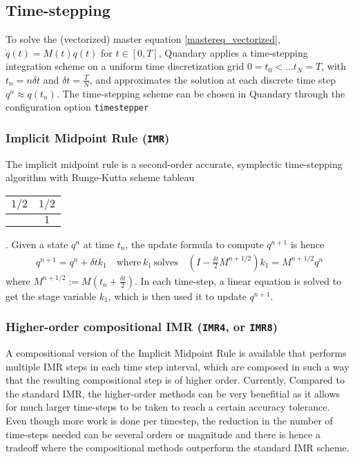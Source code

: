 \documentclass[11pt]{article}
\begin{document}
    \subsection{Time-stepping}
    To solve the (vectorized) master equation \eqref{mastereq_vectorized}, $\dot
    q(t) = M(t) q(t)$ for $t\in [0,T]$, Quandary applies a time-stepping integration
    scheme on a uniform time discretization grid $0=t_0 < \dots t_{N} = T$, with
    $t_n = n \delta t$ and $\delta t = \frac{T}{N}$, and approximates the
    solution at each discrete time step $q^{n} \approx q(t_n)$. The time-stepping scheme can be chosen in Quandary through the configuration option \texttt{timestepper}
    
    \subsubsection{Implicit Midpoint Rule (\texttt{IMR})}
    The implicit midpoint rule is a second-order accurate, symplectic time-stepping algorithm with Runge-Kutta scheme tableau 
    \begin{tabular}{ c | c }
      $1/2$ & $ 1/2$ \\
      \hline
                &  $1$
    \end{tabular}.
    Given a state $q^n$ at time $t_n$, the update formula to compute $q^{n+1}$
    is hence 
    \begin{align}
      q^{n+1} = q^n + \delta t k_1 \quad \text{where} \, k_1 \, \text{solves}
      \quad \left( I-\frac{\delta t}{2} M^{n+1/2} \right) k_1 = M^{n+1/2}  q^n
    \end{align}
    where $M^{n+1/2} := M(t_n + \frac{\delta t}{2})$. In each time-step,
    a linear equation is solved to get the stage variable $k_1$, which is then used it
    to update $q^{n+1}$. 

    \subsubsection{Higher-order compositional IMR (\texttt{IMR4}, or \texttt{IMR8})}
    A compositional version of the Implicit Midpoint Rule is available that performs multiple IMR steps in each time step interval, which are composed in such a way that the resulting compositional step is of higher order. Currently, Compared to the standard IMR, the higher-order methods can be very benefitial as it allows for much larger time-steps to be taken to reach a certain accuracy tolerance. Even though more work is done per timestep, the reduction in the number of time-steps needed can be several orders or magnitude and there is hence a tradeoff where the compositional methods outperform the standard IMR scheme.
\end{document}
